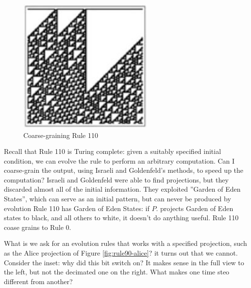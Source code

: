 \documentclass[]{article}
\begin{document}
\begin{figure}[H]
	\begin{center}
		\caption{Coarse-graining Rule 110}\label{fig:cellular-automaton-rule-6a}
		\includegraphics[width=0.6\textwidth]{cellular-automaton-rule-6}
	\end{center}
\end{figure}

Recall that Rule 110 is Turing complete: given a suitably specified initial condition, we can evolve the rule to perform an arbitrary computation. Can I coarse-grain the output, using Israeli and Goldenfeld's methods, to speed up the computation? Israeli and Goldenfeld were able to find projections, but they discarded almost all of the initial information. They exploited ''Garden of Eden States'', which can serve as an initial pattern, but can never be produced by evolution Rule 110 has Garden of Eden States: if $P$. projects Garden of Eden states to black, and all others to white, it doesn't do anything useful. Rule 110 coase grains to Rule 0.


What is we ask for an evolution rules that works with a specified projection, such as the Alice projection of Figure \ref{fig:rule90-alice}? it turns out that we cannot. Consider the inset: why did this bit switch on? It makes sense in the full view to the left, but not the decimated one on the right. What makes one time steo different from another?
\end{document}
